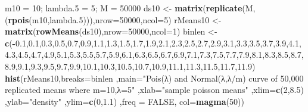 \documentclass[
]{article}
\newenvironment{Shaded}{\begin{snugshade}}{\end{snugshade}}
\newcommand{\DataTypeTok}[1]{\textcolor[rgb]{0.13,0.29,0.53}{#1}}
\newcommand{\DecValTok}[1]{\textcolor[rgb]{0.00,0.00,0.81}{#1}}
\newcommand{\FloatTok}[1]{\textcolor[rgb]{0.00,0.00,0.81}{#1}}
\newcommand{\KeywordTok}[1]{\textcolor[rgb]{0.13,0.29,0.53}{\textbf{#1}}}
\newcommand{\NormalTok}[1]{#1}
\newcommand{\OperatorTok}[1]{\textcolor[rgb]{0.81,0.36,0.00}{\textbf{#1}}}
\newcommand{\OtherTok}[1]{\textcolor[rgb]{0.56,0.35,0.01}{#1}}
\newcommand{\StringTok}[1]{\textcolor[rgb]{0.31,0.60,0.02}{#1}}
\begin{document}
\begin{Shaded}
\begin{Highlighting}[]
\NormalTok{m10 =}\StringTok{ }\DecValTok{10}\NormalTok{; lambda}\FloatTok{.5}\NormalTok{ =}\StringTok{ }\DecValTok{5}\NormalTok{; M =}\StringTok{ }\DecValTok{50000}
\NormalTok{ds10 <-}\StringTok{ }\KeywordTok{matrix}\NormalTok{(}\KeywordTok{replicate}\NormalTok{(M,(}\KeywordTok{rpois}\NormalTok{(m10,lambda}\FloatTok{.5}\NormalTok{))),}\DataTypeTok{nrow=}\DecValTok{50000}\NormalTok{,}\DataTypeTok{ncol=}\DecValTok{5}\NormalTok{)}
\NormalTok{rMeans10 <-}\StringTok{ }\KeywordTok{matrix}\NormalTok{(}\KeywordTok{rowMeans}\NormalTok{(ds10),}\DataTypeTok{nrow=}\DecValTok{50000}\NormalTok{,}\DataTypeTok{ncol=}\DecValTok{1}\NormalTok{)}
\NormalTok{binlen <-}\StringTok{ }\KeywordTok{c}\NormalTok{(}\OperatorTok{-}\FloatTok{0.1}\NormalTok{,}\FloatTok{0.1}\NormalTok{,}\FloatTok{0.3}\NormalTok{,}\FloatTok{0.5}\NormalTok{,}\FloatTok{0.7}\NormalTok{,}\FloatTok{0.9}\NormalTok{,}\FloatTok{1.1}\NormalTok{,}\FloatTok{1.3}\NormalTok{,}\FloatTok{1.5}\NormalTok{,}\FloatTok{1.7}\NormalTok{,}\FloatTok{1.9}\NormalTok{,}\FloatTok{2.1}\NormalTok{,}\FloatTok{2.3}\NormalTok{,}\FloatTok{2.5}\NormalTok{,}\FloatTok{2.7}\NormalTok{,}\FloatTok{2.9}\NormalTok{,}\FloatTok{3.1}\NormalTok{,}\FloatTok{3.3}\NormalTok{,}\FloatTok{3.5}\NormalTok{,}\FloatTok{3.7}\NormalTok{,}\FloatTok{3.9}\NormalTok{,}\FloatTok{4.1}\NormalTok{,}\FloatTok{4.3}\NormalTok{,}\FloatTok{4.5}\NormalTok{,}\FloatTok{4.7}\NormalTok{,}\FloatTok{4.9}\NormalTok{,}\FloatTok{5.1}\NormalTok{,}\FloatTok{5.3}\NormalTok{,}\FloatTok{5.5}\NormalTok{,}\FloatTok{5.7}\NormalTok{,}\FloatTok{5.9}\NormalTok{,}\FloatTok{6.1}\NormalTok{,}\FloatTok{6.3}\NormalTok{,}\FloatTok{6.5}\NormalTok{,}\FloatTok{6.7}\NormalTok{,}\FloatTok{6.9}\NormalTok{,}\FloatTok{7.1}\NormalTok{,}\FloatTok{7.3}\NormalTok{,}\FloatTok{7.5}\NormalTok{,}\FloatTok{7.7}\NormalTok{,}\FloatTok{7.9}\NormalTok{,}\FloatTok{8.1}\NormalTok{,}\FloatTok{8.3}\NormalTok{,}\FloatTok{8.5}\NormalTok{,}\FloatTok{8.7}\NormalTok{,}\FloatTok{8.9}\NormalTok{,}\FloatTok{9.1}\NormalTok{,}\FloatTok{9.3}\NormalTok{,}\FloatTok{9.5}\NormalTok{,}\FloatTok{9.7}\NormalTok{,}\FloatTok{9.9}\NormalTok{,}\FloatTok{10.1}\NormalTok{,}\FloatTok{10.3}\NormalTok{,}\FloatTok{10.5}\NormalTok{,}\FloatTok{10.7}\NormalTok{,}\FloatTok{10.9}\NormalTok{,}\FloatTok{11.1}\NormalTok{,}\FloatTok{11.3}\NormalTok{,}\FloatTok{11.5}\NormalTok{,}\FloatTok{11.7}\NormalTok{,}\FloatTok{11.9}\NormalTok{)}
\KeywordTok{hist}\NormalTok{(rMeans10,}\DataTypeTok{breaks=}\NormalTok{binlen ,}\DataTypeTok{main=}\StringTok{"Pois(λ) and Normal(λ,λ/m) curve of 50,000 replicated means where m=10,λ=5"}\NormalTok{ ,}\DataTypeTok{xlab=}\StringTok{"sample poisson means"}\NormalTok{ ,}\DataTypeTok{xlim=}\KeywordTok{c}\NormalTok{(}\DecValTok{2}\NormalTok{,}\FloatTok{8.5}\NormalTok{) ,}\DataTypeTok{ylab=}\StringTok{"density"}\NormalTok{ ,}\DataTypeTok{ylim=}\KeywordTok{c}\NormalTok{(}\DecValTok{0}\NormalTok{,}\FloatTok{1.1}\NormalTok{) ,}\DataTypeTok{freq =} \OtherTok{FALSE}\NormalTok{, }\DataTypeTok{col=}\KeywordTok{magma}\NormalTok{(}\DecValTok{50}\NormalTok{))}

\end{Highlighting}
\end{Shaded}
\end{document}
